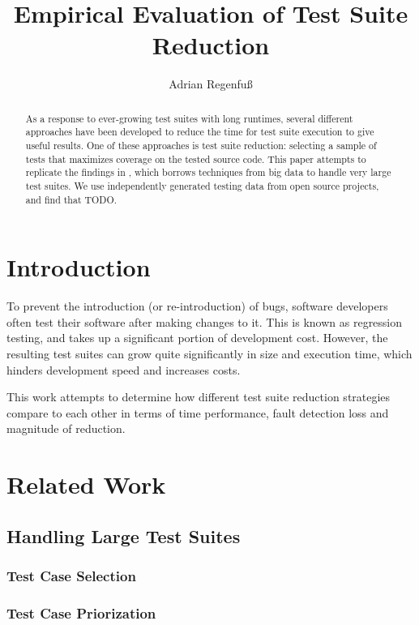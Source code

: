 \documentclass[a4paper,10pt]{article}
\title{Empirical Evaluation of Test Suite Reduction}
\author{Adrian Regenfuß}
\begin{document}
\maketitle

\tableofcontents
\newpage

\begin{abstract}
As a response to ever-growing test suites with long runtimes, several
different approaches have been developed to reduce the time for test
suite execution to give useful results. One of these approaches is test
suite reduction: selecting a sample of tests that maximizes coverage on
the tested source code. This paper attempts to replicate the findings
in \citealt{cruciani2019scalable}, which borrows techniques from big
data to handle very large test suites. We use independently generated
testing data from open source projects, and find that TODO.
\end{abstract}

\section{Introduction}

To prevent the introduction (or re-introduction) of bugs, software
developers often test their software after making changes to it.
This is known as regression testing, and takes up a significant portion
of development cost. However, the resulting test suites can grow quite
significantly in size and execution time, which hinders development
speed and increases costs.

This work attempts to determine how different test suite reduction
strategies compare to each other in terms of time performance, fault
detection loss and magnitude of reduction.

\section{Related Work}

\subsection{Handling Large Test Suites}

\subsubsection{Test Case Selection}

\subsubsection{Test Case Priorization}
\end{document}
